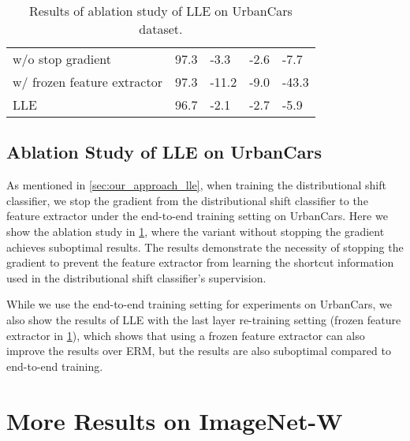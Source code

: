\documentclass[10pt,twocolumn,letterpaper]{article}
\begin{document}
\begin{table}[t]
{\begin{adjustbox}{width=\linewidth}
\begin{tabular}{@{}lllll@{}}
w/o stop gradient    & 97.3                          & -3.3          & -2.6          & -7.7          \\
w/ frozen feature extractor   & 97.3                          & -11.2          & -9.0          & -43.3          \\
LLE                  & 96.7                          & -2.1 & -2.7          & -5.9          \\ \bottomrule
\end{tabular}
\end{adjustbox}
\caption{Results of ablation study of LLE on UrbanCars dataset.}
\label{appx:tab:ablate_lle_urbancars}
}
\end{table}



\subsection{Ablation Study of LLE on UrbanCars}

As mentioned in \cref{sec:our_approach_lle}, when training the distributional shift classifier, we stop the gradient from the distributional shift classifier to the feature extractor under the end-to-end training setting on UrbanCars. Here we show the ablation study in \cref{appx:tab:ablate_lle_urbancars}, where the variant without stopping the gradient achieves suboptimal results. The results demonstrate the necessity of stopping the gradient to prevent the feature extractor from learning the shortcut information used in the distributional shift classifier's supervision.

While we use the end-to-end training setting for experiments on UrbanCars, we also show the results of LLE with the last layer re-training setting (\cf frozen feature extractor in \cref{appx:tab:ablate_lle_urbancars}), which shows that using a frozen feature extractor can also improve the results over ERM, but the results are also suboptimal compared to end-to-end training.




\section{More Results on ImageNet-W}
\end{document}
